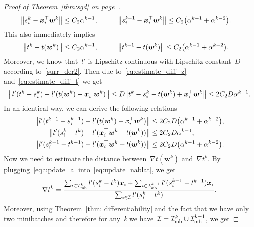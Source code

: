 \begin{proof}[Proof of Theorem~\ref{thm:sgd} on page~\pageref{thm:sgd}]
  \begin{equation}\label{eq:estimate_diff_z}
    \begin{aligned}
      \norm{s_i^k - \bm{x}_i^\top \bm{w}^k} &\leq C_2\alpha^{k-1}, \quad & \quad 
      \norm{s_i^{k-1} - \bm{x}_i^\top \bm{w}^k} &\leq C_2\Brac{\alpha^{k-1}+\alpha^{k-2}}.
    \end{aligned}
  \end{equation}
  This also immediately implies
  \begin{equation}\label{eq:estimate_diff_t}
    \begin{aligned}
      \norm{t^k - t(\bm{w}^k)}     & \leq C_2\alpha^{k-1}, \quad & \quad
      \norm{t^{k-1} - t(\bm{w}^k)} & \leq C_2\Brac{\alpha^{k-1}+\alpha^{k-2}}.
    \end{aligned}
  \end{equation}
  Moreover, we know that~$l'$ is Lipschitz continuous with Lipschitz constant~$D$ according to~\ref{surr_der2}. Then due to~\eqref{eq:estimate_diff_z} and~\eqref{eq:estimate_diff_t} we get
  \begin{equation}\label{eq:sgd_lipschitz1}
    \norm{l'(t^k-s_i^k) - l'(t(\bm{w}^k)-\bm{x}_i^\top \bm{w}^k)}
      \leq D \norm{t^k-s_i^k - t(\bm{w}^k)+ \bm{x}_i^\top \bm{w}^k}
      \leq  2C_2 D \alpha^{k-1}.
  \end{equation}
  In an identical way, we can derive the following relations
  \begin{equation}\label{eq:sgd_lipschitz2}
    \begin{aligned}
      \norm{l'(t^{k-1}-s_i^{k-1}) - l'(t(\bm{w}^k)-\bm{x}_i^\top \bm{w}^k)}
        & \leq 2C_2D\Brac{\alpha^{k-1}+\alpha^{k-2}}, \\
      \norm{l'(s_i^k-t^k) - l'(\bm{x}_i^\top \bm{w}^k-t(\bm{w}^k))}
        & \leq 2C_2D\alpha^{k-1}, \\
      \norm{l'(s_i^{k-1}-t^{k-1}) - l'(\bm{x}_i^\top \bm{w}^k-t(\bm{w}^k))}
        & \leq 2C_2D\Brac{\alpha^{k-1}+\alpha^{k-2}}.
    \end{aligned}
  \end{equation}
  Now we need to estimate the distance between~$\nabla t(\bm{w}^k)$ and~$\nabla t^k$. By plugging~\eqref{eq:update_a} into~\eqref{eq:update_nablat}, we get
  \begin{equation*}
    \nabla t^k
      = \frac{\sum_{i \in \mathcal{I}_{\text{mb}}^k} l'(s_i^k - t^k)\bm{x}_i + \sum_{i \in \mathcal{I}_{\text{mb}}^{k-1}} l'(s_i^{k-1} - t^{k-1}) \bm{x}_i}{\sum_{i \in \mathcal{I}} l'(s_i^k - t^k)}.
  \end{equation*}
  Moreover, using Theorem~\ref{thm: differentiability} and the fact that we have only two minibatches and therefore for any~$k$ we have~$\mathcal{I} = \mathcal{I}_{\text{mb}}^k \cup \mathcal{I}_{\text{mb}}^{k-1}$, we get

\end{proof}
